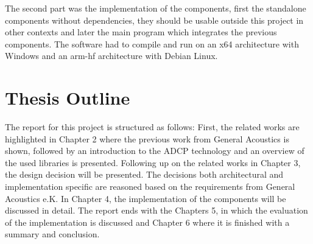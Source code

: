 The second part was the implementation of the components, first the standalone components without dependencies, they should be usable outside this project in other contexts and later the main program which integrates the previous components. The software had to compile and run on an x64 architecture with Windows and an arm-hf architecture with Debian Linux.


\section{Thesis Outline}
The report for this project is structured as follows: First, the related works are highlighted in Chapter 2 where the previous work from General Acoustics is shown, followed by an introduction to the ADCP technology and an overview of the used libraries is presented. Following up on the related works in Chapter 3, the design decision will be presented. The decisions both architectural and implementation specific are reasoned based on the requirements from General Acoustics e.K. In Chapter 4, the implementation of the components will be discussed in detail. The report ends with the Chapters 5, in which the evaluation of the implementation is discussed and Chapter 6 where it is finished with a summary and conclusion.

